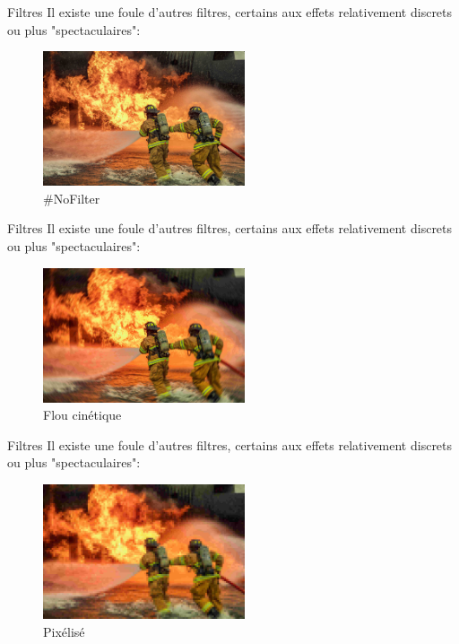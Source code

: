 \documentclass[10pt,svgnames,usenames,table]{beamer}
\begin{document}
\begin{frame}{Filtres}
		Il existe une foule d'autres filtres, certains aux effets relativement discrets ou plus "spectaculaires":
	
		\begin{figure}[H]
			\centering
				\includegraphics[height=150px]{Images/filters/compressed_original} 
				\caption{\#NoFilter}
			\end{figure}	
	\end{frame}

	\begin{frame}{Filtres}
		Il existe une foule d'autres filtres, certains aux effets relativement discrets ou plus "spectaculaires":
	
		\begin{figure}[H]
			\centering
				\includegraphics[height=150px]{Images/filters/motion_blur} 
				\caption{Flou cinétique}
			\end{figure}	
	\end{frame}

\begin{frame}{Filtres}
		Il existe une foule d'autres filtres, certains aux effets relativement discrets ou plus "spectaculaires":
	
		\begin{figure}[H]
			\centering
				\includegraphics[height=150px]{Images/filters/pixelize} 
				\caption{Pixélisé}
			\end{figure}	
	\end{frame}
\end{document}
